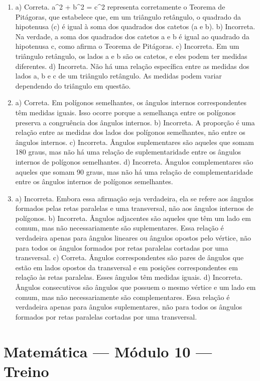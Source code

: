 \begin{enumerate}
\item a) Correta. a^2 + b^2 = c^2 representa corretamente o Teorema de Pitágoras, que estabelece que, em um triângulo retângulo, o quadrado da
hipotenusa (c) é igual à soma dos quadrados dos catetos (a e b).
b) Incorreta. Na verdade, a soma dos quadrados dos catetos a e b é igual ao quadrado da hipotenusa c, como afirma o Teorema de Pitágoras.
c) Incorreta. Em um triângulo retângulo, os lados a e b são os catetos, e eles podem ter medidas diferentes.
d) Incorreta. Não há uma relação específica entre as medidas dos lados a, b e c de um triângulo retângulo. As medidas podem variar dependendo do triângulo em questão.

\item a) Correta. Em polígonos semelhantes, os ângulos internos
correspondentes têm medidas iguais. Isso ocorre porque a semelhança entre os polígonos preserva a congruência dos ângulos internos.
b) Incorreta. A proporção é uma relação entre as medidas dos lados dos polígonos semelhantes, não entre os ângulos internos.
c) Incorreta. Ângulos suplementares são aqueles que somam 180 graus, mas não há uma relação de suplementaridade entre os ângulos internos de polígonos semelhantes.
d) Incorreta. Ângulos complementares são aqueles que somam 90 graus, mas não há uma relação de complementaridade entre os ângulos internos de polígonos semelhantes.

\item a) Incorreta. Embora essa afirmação seja verdadeira, ela se refere aos ângulos formados pelas retas paralelas e uma transversal, não aos ângulos internos de polígonos.
b) Incorreta. Ângulos adjacentes são aqueles que têm um lado em comum, mas não necessariamente são suplementares. Essa relação é verdadeira apenas para ângulos lineares ou ângulos opostos pelo vértice,
não para todos os ângulos formados por retas paralelas cortadas por uma transversal.
c) Correta. Ângulos correspondentes são pares de ângulos que estão em lados opostos da transversal e em posições correspondentes em relação às retas paralelas. Esses ângulos têm medidas iguais.
d) Incorreta. Ângulos consecutivos são ângulos que possuem o mesmo vértice e um lado em comum, mas não necessariamente são complementares.
Essa relação é verdadeira apenas para ângulos suplementares, não para todos os ângulos formados por retas paralelas cortadas por uma transversal.
\end{enumerate}

\section*{Matemática — Módulo 10 — Treino}

